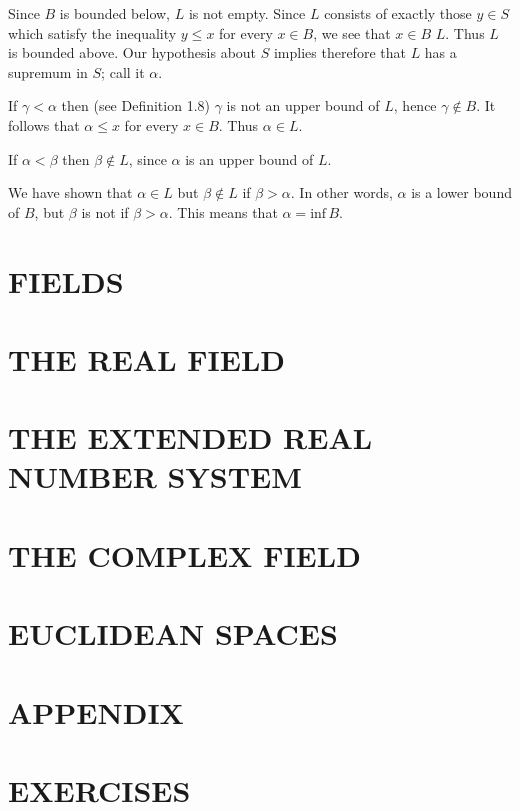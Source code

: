 \begin{list}{}{\leftmargin=\parindent\rightmargin=0pt}
\item {} Since $B$ is bounded below, $L$ is not empty. Since $L$ consists of exactly those $y \in S$ which satisfy the inequality $y \leq x$ for every $x \in B$, we see that  $x \in B$  $L$. Thus $L$ is bounded above. 
Our hypothesis about $S$ implies therefore that $L$ has a supremum in $S$; call it $\alpha$.

If $\gamma < \alpha$  then (see Definition 1.8) $\gamma$ is not an upper bound of $L$, hence $\gamma \notin B$. It follows that 
$\alpha \leq x$ for every $x \in B$. Thus $\alpha \in L$. 

If $\alpha < \beta$ then $\beta \notin L$, since $\alpha$ is an upper bound of $L$. 

We have shown that $\alpha \in L$ but $\beta \notin L$ if $\beta > \alpha$. In other words, $\alpha$ is a lower bound of $B$, but $\beta$ is not if $\beta > \alpha$. This means that $\alpha = \text{inf}\,B$.       
\end{list}


\section*{FIELDS}


\section*{THE REAL FIELD}


\section*{THE EXTENDED REAL NUMBER SYSTEM}


\section*{THE COMPLEX FIELD}


\section*{EUCLIDEAN SPACES}


\section*{APPENDIX}


\section*{EXERCISES}





